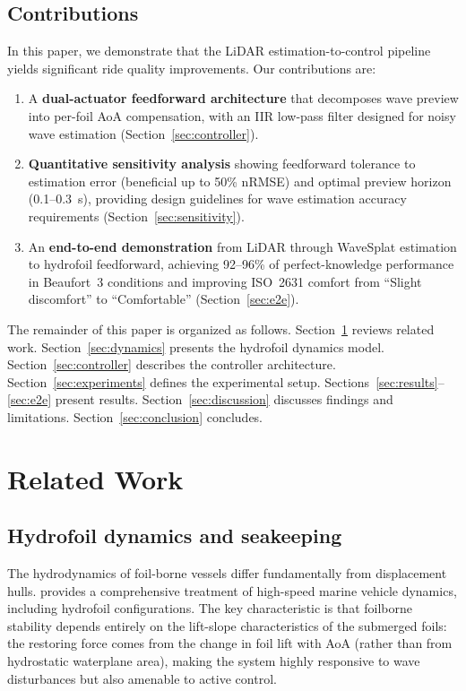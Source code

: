 \documentclass[review]{elsarticle}
\begin{document}
\subsection{Contributions}

In this paper, we demonstrate that the LiDAR estimation-to-control
pipeline yields significant ride quality improvements.
Our contributions are:
\begin{enumerate}
  \item A \textbf{dual-actuator feedforward architecture} that
    decomposes wave preview into per-foil AoA compensation,
    with an IIR low-pass filter designed for noisy wave estimation
    (Section~\ref{sec:controller}).
  \item \textbf{Quantitative sensitivity analysis} showing feedforward
    tolerance to estimation error (beneficial up to 50\% nRMSE) and
    optimal preview horizon (0.1--0.3~s), providing design guidelines
    for wave estimation accuracy requirements
    (Section~\ref{sec:sensitivity}).
  \item An \textbf{end-to-end demonstration} from LiDAR through
    WaveSplat estimation to hydrofoil feedforward, achieving
    92--96\% of perfect-knowledge performance in Beaufort~3 conditions
    and improving ISO~2631 comfort from ``Slight discomfort'' to
    ``Comfortable'' (Section~\ref{sec:e2e}).
\end{enumerate}

The remainder of this paper is organized as follows.
Section~\ref{sec:related} reviews related work.
Section~\ref{sec:dynamics} presents the hydrofoil dynamics model.
Section~\ref{sec:controller} describes the controller architecture.
Section~\ref{sec:experiments} defines the experimental setup.
Sections~\ref{sec:results}--\ref{sec:e2e} present results.
Section~\ref{sec:discussion} discusses findings and limitations.
Section~\ref{sec:conclusion} concludes.

\section{Related Work}
\label{sec:related}

\subsection{Hydrofoil dynamics and seakeeping}

The hydrodynamics of foil-borne vessels differ fundamentally from
displacement hulls.
\citet{faltinsen2005} provides a comprehensive treatment of
high-speed marine vehicle dynamics, including hydrofoil configurations.
The key characteristic is that foilborne stability depends entirely
on the lift-slope characteristics of the submerged foils: the
restoring force comes from the change in foil lift with AoA
(rather than from hydrostatic waterplane area), making the system
highly responsive to wave disturbances but also amenable to
active control.
\end{document}
